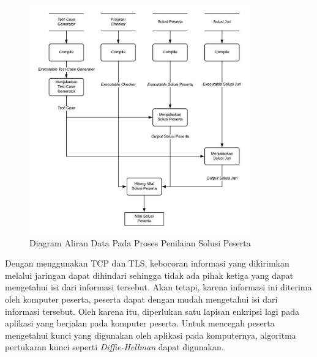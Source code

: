 \begin{figure}
    \centering
    \includegraphics[width=0.85\textwidth]{images/grading-dfd}
    \caption{Diagram Aliran Data Pada Proses Penilaian Solusi Peserta}
    \label{fig:grading-dfd}
\end{figure}

\par Dengan menggunakan TCP dan TLS, kebocoran informasi yang dikirimkan melalui jaringan dapat dihindari sehingga tidak ada pihak ketiga yang dapat mengetahui isi dari informasi tersebut. Akan tetapi, karena informasi ini diterima oleh komputer peserta, peserta dapat dengan mudah mengetahui isi dari informasi tersebut. Oleh karena itu, diperlukan satu lapisan enkripsi lagi pada aplikasi yang berjalan pada komputer peserta. Untuk mencegah peserta mengetahui kunci yang digunakan oleh aplikasi pada komputernya, algoritma pertukaran kunci seperti \textit{Diffie-Hellman} dapat digunakan.

